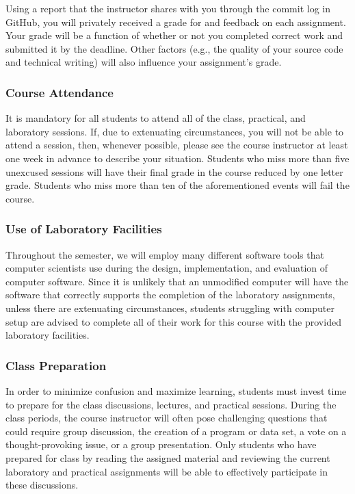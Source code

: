 \documentclass[11pt]{article}
\begin{document}
Using a report that the instructor shares with you through the commit log in
GitHub, you will privately received a grade for and feedback on each assignment.
Your grade will be a function of whether or not you completed correct work and
submitted it by the deadline. Other factors (e.g., the quality of your source
code and technical writing) will also influence your assignment's grade.

\subsubsection*{Course Attendance}

It is mandatory for all students to attend all of the class, practical, and
laboratory sessions. If, due to extenuating circumstances, you will not be able
to attend a session, then, whenever possible, please see the course instructor
at least one week in advance to describe your situation. Students who miss more
than five unexcused sessions will have their final grade in the course reduced
by one letter grade. Students who miss more than ten of the aforementioned
events will fail the course.

\subsubsection*{Use of Laboratory Facilities}

Throughout the semester, we will employ many different software tools that
computer scientists use during the design, implementation, and evaluation of
computer software. Since it is unlikely that an unmodified computer will have
the software that correctly supports the completion of the laboratory
assignments, unless there are extenuating circumstances, students struggling
with computer setup are advised to complete all of their work for this course
with the provided laboratory facilities.

\subsubsection*{Class Preparation}

In order to minimize confusion and maximize learning, students must invest time
to prepare for the class discussions, lectures, and practical sessions. During
the class periods, the course instructor will often pose challenging questions
that could require group discussion, the creation of a program or data set, a
vote on a thought-provoking issue, or a group presentation. Only students who
have prepared for class by reading the assigned material and reviewing the
current laboratory and practical assignments will be able to effectively
participate in these discussions.
\end{document}
